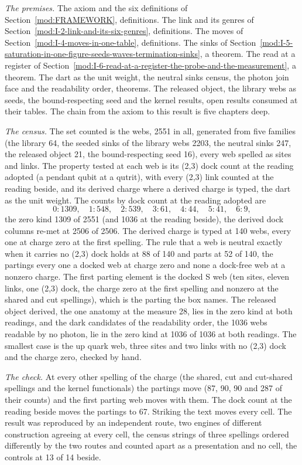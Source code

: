 \begin{chproof}
\textit{The premises.} The axiom and the six definitions of Section~\ref{mod:FRAMEWORK}, definitions. The link and its genres of Section~\ref{mod:I-2-link-and-its-six-genres}, definitions. The moves of Section~\ref{mod:I-4-moves-in-one-table}, definitions. The sinks of Section~\ref{mod:I-5-saturation-in-one-figure-seeds-waves-termination-sinks}, a theorem. The read at a register of Section~\ref{mod:I-6-read-at-a-register-the-probe-and-the-measurement}, a theorem. The dart as the unit weight, the neutral sinks census, the photon join face and the readability order, theorems. The released object, the library webs as seeds, the bound-respecting seed and the kernel results, open results consumed at their tables. The chain from the axiom to this result is five chapters deep.

\textit{The census.} The set counted is the webs, 2551 in all, generated from five families (the library 64, the seeded sinks of the library webs 2203, the neutral sinks 247, the released object 21, the bound-respecting seed 16), every web spelled as sites and links. The property tested at each web is its (2,3) dock count at the reading adopted (a pendant qubit at a qutrit), with every (2,3) link counted at the reading beside, and its derived charge where a derived charge is typed, the dart as the unit weight. The counts by dock count at the reading adopted are
\begin{equation}
0{:}1309,\quad 1{:}548,\quad 2{:}539,\quad 3{:}61,\quad 4{:}44,\quad 5{:}41,\quad 6{:}9 ,
\end{equation}
the zero kind 1309 of 2551 (and 1036 at the reading beside), the derived dock columns re-met at 2506 of 2506. The derived charge is typed at 140 webs, every one at charge zero at the first spelling. The rule that a web is neutral exactly when it carries no (2,3) dock holds at 88 of 140 and parts at 52 of 140, the partings every one a docked web at charge zero and none a dock-free web at a nonzero charge. The first parting element is the docked S web (ten sites, eleven links, one (2,3) dock, the charge zero at the first spelling and nonzero at the shared and cut spellings), which is the parting the box names. The released object derived, the one anatomy at the measure 28, lies in the zero kind at both readings, and the dark candidates of the readability order, the 1036 webs readable by no photon, lie in the zero kind at 1036 of 1036 at both readings. The smallest case is the up quark web, three sites and two links with no (2,3) dock and the charge zero, checked by hand.

\textit{The check.} At every other spelling of the charge (the shared, cut and cut-shared spellings and the kernel functionals) the partings move (87, 90, 90 and 287 of their counts) and the first parting web moves with them. The dock count at the reading beside moves the partings to 67. Striking the text moves every cell. The result was reproduced by an independent route, two engines of different construction agreeing at every cell, the census strings of three spellings ordered differently by the two routes and counted apart as a presentation and no cell, the controls at 13 of 14 beside.
\end{chproof}
